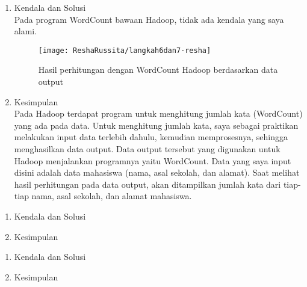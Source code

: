 \begin{enumerate}
\item Kendala dan Solusi \\
Pada program WordCount bawaan Hadoop, tidak ada kendala yang saya alami.

\begin{figure}[!ht]
\texttt{[image: ReshaRussita/langkah6dan7-resha]}
\caption{Hasil perhitungan dengan WordCount Hadoop berdasarkan data output}
\label{gam:perkuliahan-08-12}
\end{figure}

\item Kesimpulan \\
Pada Hadoop terdapat program untuk menghitung jumlah kata (WordCount) yang ada pada data. Untuk menghitung jumlah kata, saya sebagai praktikan melakukan input data terlebih dahulu, kemudian memprosesnya, sehingga menghasilkan data output. Data output tersebut yang digunakan untuk Hadoop menjalankan programnya yaitu WordCount.
Data yang saya input disini adalah data mahasiswa (nama, asal sekolah, dan alamat). Saat melihat hasil perhitungan pada data output, akan ditampilkan jumlah kata dari tiap-tiap nama, asal sekolah, dan alamat mahasiswa.
\end{enumerate}


\begin{enumerate}
\item Kendala dan Solusi

\item Kesimpulan

\end{enumerate}

\begin{enumerate}
\item Kendala dan Solusi

\item Kesimpulan

\end{enumerate}
